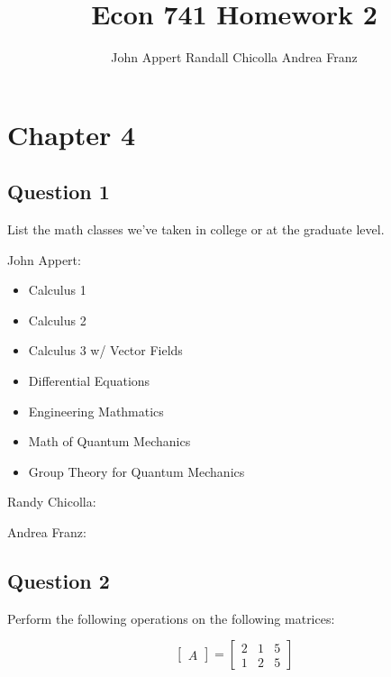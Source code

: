 \documentclass{article}
\begin{document}
\title{Econ 741 Homework 2}
\author{John Appert Randall Chicolla Andrea Franz}
\maketitle

\section{Chapter 4}

\subsection{Question 1}

List the math classes we've taken in college or at the graduate level.

John Appert:

\begin{itemize}
\item Calculus 1
\item Calculus 2
\item Calculus 3 w/ Vector Fields
\item Differential Equations
\item Engineering Mathmatics
\item Math of Quantum Mechanics
\item Group Theory for Quantum Mechanics
\end{itemize}

Randy Chicolla:

\begin{itemize}

\end{itemize}

Andrea Franz:

\begin{itemize}

\end{itemize}

\subsection{Question 2}

Perform the following operations on the following matrices:

\begin{equation}
\begin{bmatrix}
A
\end{bmatrix}
=\begin{bmatrix}
2&1&5\\
1&2&5
\end{bmatrix}
\end{equation} 
\end{document}

